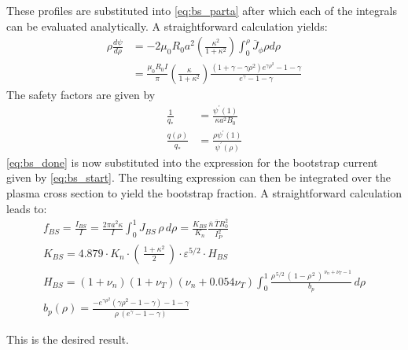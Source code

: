These profiles are substituted into \cref{eq:bs_parta} after which each of the integrals can be evaluated analytically. A straightforward calculation yields:
\begin{equation}
\label{eq:bs_done}
\begin{aligned} \rho \frac { d \psi } { d \rho } & = - 2 \mu _ { 0 } R _ { 0 } a ^ { 2 } \left( \frac { \kappa ^ { 2 } } { 1 + \kappa ^ { 2 } } \right) \int _ { 0 } ^ { \rho } \overline { J } _ { \phi } \rho d \rho \\ & = \frac { \mu _ { 0 } R _ { 0 } I } { \pi } \left( \frac { \kappa } { 1 + \kappa ^ { 2 } } \right) \frac { \left( 1 + \gamma - \gamma \rho ^ { 2 } \right) e ^ { \gamma \rho ^ { 2 } } - 1 - \gamma } { e ^ { \gamma } - 1 - \gamma } \end{aligned}
\end{equation}
The safety factors are given by
\begin{equation}
\begin{aligned} \frac { 1 } { q _ { * } } & = \frac { \psi ^ { \prime } ( 1 ) } { \kappa a ^ { 2 } B _ { 0 } } \\ \frac { q ( \rho ) } { q _ { * } } & = \frac { \rho \psi ^ { \prime } ( 1 ) } { \psi ^ { \prime } ( \rho ) } \end{aligned}
\end{equation}
\cref{eq:bs_done} is now substituted into the expression for the bootstrap current given by \cref{eq:bs_start}. The resulting expression can then be integrated over the plasma cross section to yield the bootstrap fraction. A straightforward calculation leads to: ~
\begin{gather}
	f_{BS} = \frac{I_{BS}}{I} = \frac{ 2 \pi a^2 \kappa }{I} \int_0^1 J_{BS} \, \rho \, d\rho = \frac{ K_{BS} }{ K_n } \frac{\overline n \, \overline T R_0^2}{I_P^2} \\
  K_{BS} = 4.879 \cdot  K_n \cdot \left( \, \frac{1+\kappa^2}{2} \, \right) \cdot \varepsilon^{5/2} \cdot H_{BS} \\
  H_{BS} = ( 1 + \nu_n ) ( 1 + \nu_T ) ( \nu_n + 0.054 \nu_T ) \int_0^1 \frac{ \rho^{\,5/2} \, ( \, 1 - \rho^{\,2} \, )^{\, \nu_n + \nu_T - 1} }{b_p} \, d\rho \\
	b_p(\rho) = \frac{ -e^{\gamma\rho^2} ( \gamma\rho^2 - 1 - \gamma ) - 1 - \gamma }{\rho \,( e^\gamma - 1 - \gamma ) }
\end{gather}

This is the desired result.
